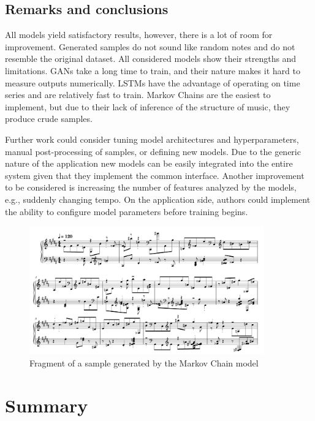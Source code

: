 \documentclass[a4paper, 11pt, twoside]{report}
\theoremstyle{definition}
\begin{document}
\section{Remarks and conclusions}

All models yield satisfactory results, however, there is a lot of room for improvement. Generated samples do not sound like random notes and do not resemble the original dataset. All considered models show their strengths and limitations. GANs take a long time to train, and their nature makes it hard to measure outputs numerically. LSTMs have the advantage of operating on time series and are relatively fast to train. Markov Chains are the easiest to implement, but due to their lack of inference of the structure of music, they produce crude samples. \par
Further work could consider tuning model architectures and hyperparameters, manual post-processing of samples, or defining new models. Due to the generic nature of the application new models can be easily integrated into the entire system given that they implement the common interface. Another improvement to be considered is increasing the number of features analyzed by the models, e.g., suddenly changing tempo. On the application side, authors could implement the ability to configure model parameters before training begins. \par

\begin{figure}[t]
    \begin{center}
        \includegraphics[width=0.9\textwidth]{markov_sample.png}
        \caption{Fragment of a sample generated by the Markov Chain model}
        \label{fig:markov-sample}
    \end{center}
\end{figure}



\chapter*{Summary}
\end{document}
